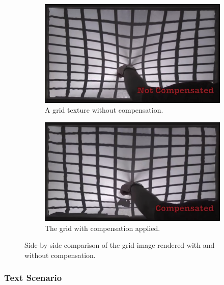 \documentclass[]{article}
\begin{document}
\begin{figure}[!h]
\centering
\begin{subfigure}{.5\textwidth}
  \centering
  \includegraphics[width=0.9\linewidth]{figures/compensation/GridNotCompensated.png}
  \caption{A grid texture without compensation.}
  \label{fig:GridNotCompensated}
\end{subfigure}%
\begin{subfigure}{.5\textwidth}
  \centering
  \includegraphics[width=0.9\linewidth]{figures/compensation/GridCompensated.png}
  \caption{The grid with compensation applied.}
  \label{fig:GridCompensated}
\end{subfigure}
\caption{Side-by-side comparison of the grid image rendered with and without compensation.}
\label{fig:GridComparison}
\end{figure}

\subsubsection{Text Scenario}
\end{document}
